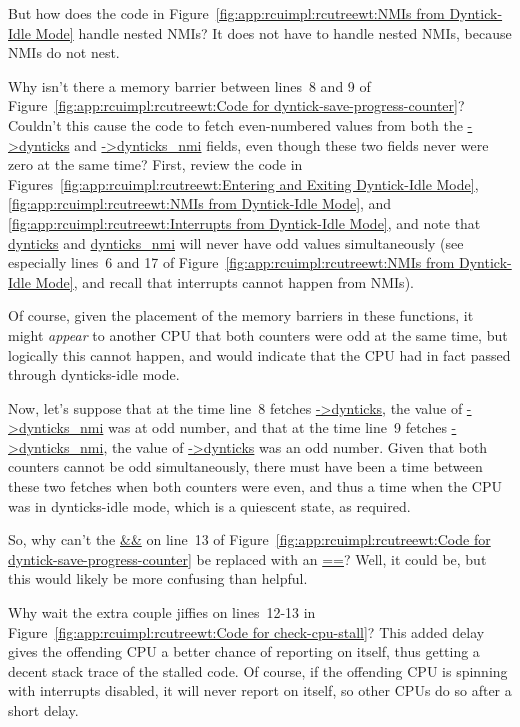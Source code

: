 \QuickQ{}
	But how does the code in
	Figure~\ref{fig:app:rcuimpl:rcutreewt:NMIs from Dyntick-Idle Mode}
	handle nested NMIs?
\QuickA{}
	It does not have to handle nested NMIs, because NMIs do not nest.

\QuickQ{}
	Why isn't there a memory barrier between lines~8 and 9 of
	Figure~\ref{fig:app:rcuimpl:rcutreewt:Code for dyntick-save-progress-counter}?
	Couldn't this cause the code to fetch even-numbered values
	from both the \url{->dynticks} and \url{->dynticks_nmi} fields,
	even though these two fields never were zero at the same time?
\QuickA{}
	First, review the code in
	Figures~\ref{fig:app:rcuimpl:rcutreewt:Entering and Exiting Dyntick-Idle Mode},
	\ref{fig:app:rcuimpl:rcutreewt:NMIs from Dyntick-Idle Mode}, and
	\ref{fig:app:rcuimpl:rcutreewt:Interrupts from Dyntick-Idle Mode},
	and note that \url{dynticks} and \url{dynticks_nmi} will never
	have odd values simultaneously (see especially lines~6 and 17 of
	Figure~\ref{fig:app:rcuimpl:rcutreewt:NMIs from Dyntick-Idle Mode},
	and recall that interrupts cannot happen from NMIs).

	Of course, given the placement of the memory barriers in these
	functions, it might \emph{appear} to another CPU that both
	counters were odd at the same time, but logically this cannot
	happen, and would indicate that the CPU had in fact passed
	through dynticks-idle mode.

	Now, let's suppose that at the time line~8 fetches \url{->dynticks},
	the value of \url{->dynticks_nmi} was at odd number, and that at the
	time line~9 fetches \url{->dynticks_nmi}, the value of
	\url{->dynticks} was an odd number.
	Given that both counters cannot be odd simultaneously, there must
	have been a time between these two fetches when both counters
	were even, and thus a time when the CPU was in dynticks-idle
	mode, which is a quiescent state, as required.

	So, why can't the \url{&&} on line~13 of
	Figure~\ref{fig:app:rcuimpl:rcutreewt:Code for dyntick-save-progress-counter}
	be replaced with an \url{==}?
	Well, it could be, but this would likely be more confusing
	than helpful.

\QuickQ{}
	Why wait the extra couple jiffies on lines~12-13 in
	Figure~\ref{fig:app:rcuimpl:rcutreewt:Code for check-cpu-stall}?
\QuickA{}
	This added delay gives the offending CPU a better chance of
	reporting on itself, thus getting a decent stack trace of
	the stalled code.
	Of course, if the offending CPU is spinning with interrupts
	disabled, it will never report on itself, so other CPUs
	do so after a short delay.

